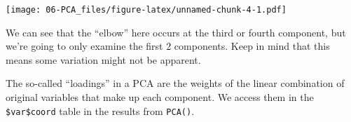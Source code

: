 \documentclass[
]{book}
\newenvironment{Shaded}{\begin{snugshade}}{\end{snugshade}}
\newcommand{\AttributeTok}[1]{\textcolor[rgb]{0.13,0.29,0.53}{#1}}
\newcommand{\CommentTok}[1]{\textcolor[rgb]{0.56,0.35,0.01}{\textit{#1}}}
\newcommand{\DecValTok}[1]{\textcolor[rgb]{0.00,0.00,0.81}{#1}}
\newcommand{\FunctionTok}[1]{\textcolor[rgb]{0.13,0.29,0.53}{\textbf{#1}}}
\newcommand{\NormalTok}[1]{#1}
\newcommand{\SpecialCharTok}[1]{\textcolor[rgb]{0.81,0.36,0.00}{\textbf{#1}}}
\newcommand{\StringTok}[1]{\textcolor[rgb]{0.31,0.60,0.02}{#1}}
\begin{document}
\begin{Shaded}
\end{Shaded}

\texttt{[image: 06-PCA\_files/figure-latex/unnamed-chunk-4-1.pdf]}

We can see that the ``elbow'' here occurs at the third or fourth component, but we're going to only examine the first 2 components. Keep in mind that this means some variation might not be apparent.

The so-called ``loadings'' in a PCA are the weights of the linear combination of original variables that make up each component. We access them in the \texttt{\$var\$coord} table in the results from \texttt{PCA()}.

\begin{Shaded}
\end{Shaded}
\end{document}

